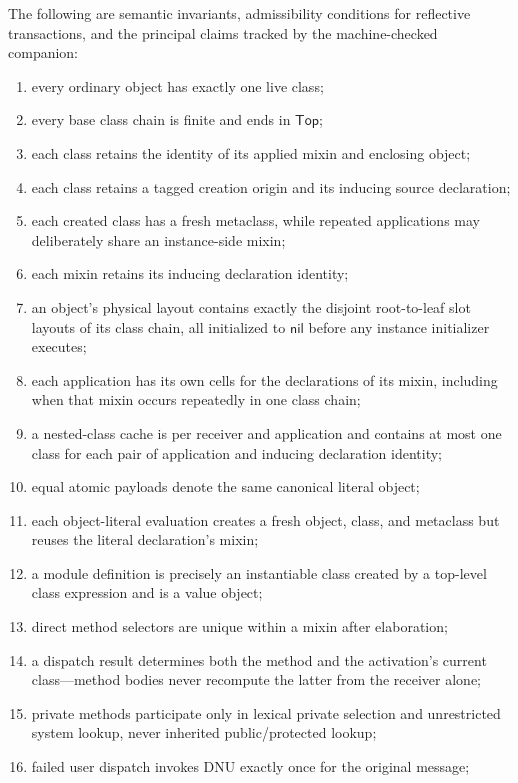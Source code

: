 \documentclass[11pt]{article}
\numberwithin{equation}{section}
\newcommand{\kw}[1]{\ensuremath{\mathsf{#1}}}
\newcommand{\nil}{\kw{nil}}
\newcommand{\Top}{\kw{Top}}
\begin{document}
The following are semantic invariants, admissibility conditions for reflective
transactions, and the principal claims tracked by the machine-checked
companion:
\begin{enumerate}
\item every ordinary object has exactly one live class;
\item every base class chain is finite and ends in \Top;
\item each class retains the identity of its applied mixin and enclosing object;
\item each class retains a tagged creation origin and its inducing source
      declaration;
\item each created class has a fresh metaclass, while repeated applications may
      deliberately share an instance-side mixin;
\item each mixin retains its inducing declaration identity;
\item an object's physical layout contains exactly the disjoint root-to-leaf
      slot layouts of its class chain, all initialized to $\nil$ before any
      instance initializer executes;
\item each application has its own cells for the declarations of its mixin,
      including when that mixin occurs repeatedly in one class chain;
\item a nested-class cache is per receiver and application and contains at most
      one class for each pair of application and inducing declaration identity;
\item equal atomic payloads denote the same canonical literal object;
\item each object-literal evaluation creates a fresh object, class, and
      metaclass but reuses the literal declaration's mixin;
\item a module definition is precisely an instantiable class created by a
      top-level class expression and is a value object;
\item direct method selectors are unique within a mixin after elaboration;
\item a dispatch result determines both the method and the activation's current
      class---method bodies never recompute the latter from the receiver alone;
\item private methods participate only in lexical private selection and
      unrestricted system lookup, never inherited public/protected lookup;
\item failed user dispatch invokes DNU exactly once for the original message;

\end{enumerate}
\end{document}

